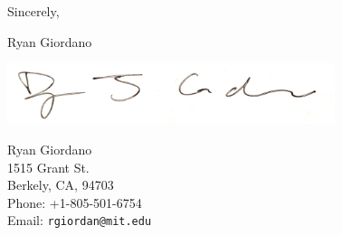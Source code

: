 \vspace{1em} Sincerely,

\begin{minipage}[t]{0.7\textwidth}
\vspace{1em} Ryan Giordano

\hspace{-1em}\includegraphics[height=0.7in]{static_images/sig.jpg}
\end{minipage}
\begin{minipage}[t]{0.3\textwidth}
    \vspace{1em}
    Ryan Giordano\\
    1515 Grant St.\\
    Berkely, CA, 94703\\
    Phone: +1-805-501-6754\\
    Email: \texttt{rgiordan@mit.edu}\\
\end{minipage}


